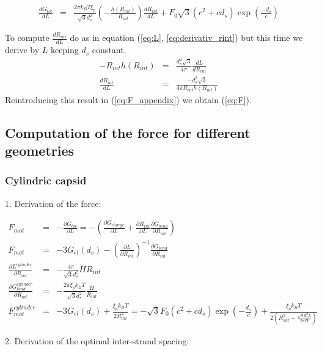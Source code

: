 \documentclass{article}
\begin{document}
\begin{eqnarray}
    \frac{d G_{tot}}{d L} &=& \frac{2 \pi k_B T \xi_p}{\sqrt{3} d_s^2} \left( - \frac{h(R_{int})}{R_{int}} \right) \frac{d R_{int}}{d L} + F_0 \sqrt{3} \left( c^2 + c d_s \right) \exp{ \left( \frac{-d_s}{c} \right) }
    \label{eq:F_appendix}
\end{eqnarray}

To compute $\frac{d R_{int}}{d L} $ do as in equation (\ref{eq:L}, \ref{eq:derivativ_rint}) but this time we derive by $L$ keeping $d_s$ constant.
\begin{eqnarray*}
    -R_{int} h(R_{int}) &=& \frac{d_s^2 \sqrt{3}}{4 \pi} \frac{ d L}{d R_{int}} \\
    \frac{d R_{int}}{dL} &=& \frac{ - d_s^2 \sqrt{3} }{ 4 \pi R_{int} h(R_{int}) }
\end{eqnarray*}
Reintroducing this result in (\ref{eq:F_appendix}) we obtain (\ref{eq:F}).

\subsection*{Computation of the force for different geometries}


\subsubsection*{Cylindric capsid}

1. Derivation of the force:

\begin{eqnarray*}
    F_{mot} & = & -\frac{\partial G_{tot}}{\partial L} = -(\frac{\partial G_{charge}}{\partial L} + \frac{\partial R_{int}}{\partial L} \frac{\partial G_{bend}}{\partial R_{int}}) \\
    F_{mot} & = & -3 G_{el}(d_s) - \left( \frac{\partial L}{\partial R_{int}} \right)^{-1} \frac{\partial G_{bend}}{\partial R_{int}} \\
    \frac{\partial L^{cylinder}}{\partial R_{int}} & = & -\frac{4 \pi }{\sqrt{3}d_s^2} H R_{int} \\
    \frac{\partial G_{bend}^{cylinder}}{\partial R_{int}} & = & - \frac{2\pi \xi_p k_B T}{\sqrt{3}d_s^2} \frac{H}{R_{int}}  \\
F_{mot}^{cylinder} & = & -3 G_{el}(d_s) +  \frac{\xi_pk_B T}{2R_{int}^2} = -\sqrt{3}F_0(c^2 + cd_s)\exp(-\frac{d_s}{c}) + \frac{\xi_pk_BT}{2(R_{out}^2 - \frac{\sqrt{3}d_s^2L}{2\pi H})}
\end{eqnarray*}

2. Derivation of the optimal inter-strand spacing:
\end{document}
